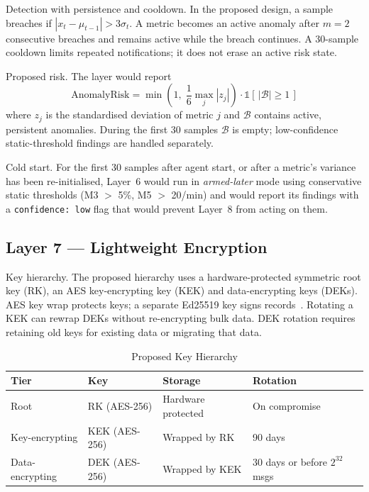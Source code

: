 \documentclass{ieeeaccess}
\renewcommand{\textbf}[1]{#1}
\begin{document}
\noindent\textbf{Detection with persistence and cooldown.} In the proposed design, a sample breaches if $|x_t-\mu_{t-1}|>3\sigma_t$. A metric becomes an active anomaly after $m=2$ consecutive breaches and remains active while the breach continues. A 30-sample cooldown limits repeated notifications; it does not erase an active risk state.

\noindent\textbf{Proposed risk.} The layer would report
\begin{equation}
\text{AnomalyRisk} = \min\!\left(1,\;
\frac{1}{6}\max_j |z_j|\right) \cdot \mathbb{1}[\,|\mathcal{B}| \geq 1\,]
\label{eq:anomaly}
\end{equation}
where $z_j$ is the standardised deviation of metric $j$ and $\mathcal{B}$ contains active, persistent anomalies. During the first 30 samples $\mathcal{B}$ is empty; low-confidence static-threshold findings are handled separately.

\noindent\textbf{Cold start.} For the first 30 samples after agent start, or after a metric's variance has been re-initialised, Layer~6 would run in \emph{armed-later} mode using conservative static thresholds (M3 $>$ 5\%, M5 $>$ 20/min) and would report its findings with a \texttt{confidence: low} flag that would prevent Layer~8 from acting on them.

\subsection{Layer 7 --- Lightweight Encryption}
\label{subsec:layer7}

\noindent\textbf{Key hierarchy.} The proposed hierarchy uses a hardware-protected symmetric root key (RK), an AES key-encrypting key (KEK) and data-encrypting keys (DEKs). AES key wrap protects keys; a separate Ed25519 key signs records~\cite{b_aes_wrap,b_ed25519}. Rotating a KEK can rewrap DEKs without re-encrypting bulk data. DEK rotation requires retaining old keys for existing data or migrating that data.

\begin{table}[ht]
\caption{Proposed Key Hierarchy}
\label{tab:keys}
\centering
\setlength{\tabcolsep}{3pt}
\begin{tabular}{|p{34pt}|p{50pt}|p{44pt}|p{34pt}|}
\hline
\textbf{Tier} & \textbf{Key} & \textbf{Storage} & \textbf{Rotation} \\
\hline
Root & RK (AES-256) & Hardware protected & On compromise \\
\hline
Key-encrypting & KEK (AES-256) & Wrapped by RK & 90 days \\
\hline
Data-encrypting & DEK (AES-256) & Wrapped by KEK & 30 days or before $2^{32}$ msgs \\
\hline
\end{tabular}
\end{table}
\end{document}
